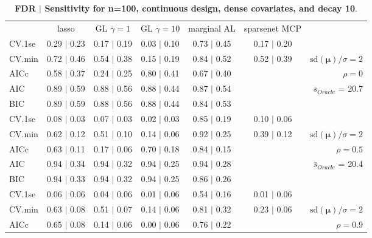 \begin{table}\vspace{-.5cm}
\caption[l]{ {\it }
{ \bf FDR $\boldsymbol{\mid}$ Sensitivity for n=100, continuous design, dense covariates, and  decay  10}.}
\vspace{-.5cm}
\footnotesize{}
\begin{center}
\begin{tabular}{l*{5}{c}|r}
 & lasso & GL $\gamma=1$ & GL $\gamma=10$ & marginal AL & sparsenet MCP  & \\
 \cline{1-7}
CV.1se & 0.29 $\mid$ 0.23 & 0.17 $\mid$ 0.19 & 0.03 $\mid$ 0.10 & 0.73 $\mid$ 0.45 & 0.17 $\mid$ 0.20 & \\
CV.min & 0.72 $\mid$ 0.46 & 0.54 $\mid$ 0.38 & 0.15 $\mid$ 0.19 & 0.84 $\mid$ 0.52 & 0.52 $\mid$ 0.39 &  $\mathrm{sd}(\mathbf{\mu})/\sigma=2$ \\
AICc & 0.58 $\mid$ 0.37 & 0.24 $\mid$ 0.25 & 0.80 $\mid$ 0.41 & 0.67 $\mid$ 0.40 & & $\rho=0$ \\
AIC & 0.89 $\mid$ 0.59 & 0.88 $\mid$ 0.56 & 0.88 $\mid$ 0.44 & 0.87 $\mid$ 0.54 & &  \multirow{2}{*}{$\bar{s}_{Oracle}$ = 20.7} \\
BIC & 0.89 $\mid$ 0.59 & 0.88 $\mid$ 0.56 & 0.88 $\mid$ 0.44 & 0.84 $\mid$ 0.53 & &  \\
 \hline 
CV.1se & 0.08 $\mid$ 0.03 & 0.07 $\mid$ 0.03 & 0.02 $\mid$ 0.03 & 0.85 $\mid$ 0.19 & 0.10 $\mid$ 0.06 & \\
CV.min & 0.62 $\mid$ 0.12 & 0.51 $\mid$ 0.10 & 0.14 $\mid$ 0.06 & 0.92 $\mid$ 0.25 & 0.39 $\mid$ 0.12 &  $\mathrm{sd}(\mathbf{\mu})/\sigma=2$ \\
AICc & 0.63 $\mid$ 0.11 & 0.17 $\mid$ 0.06 & 0.70 $\mid$ 0.18 & 0.84 $\mid$ 0.15 & & $\rho=0.5$ \\
AIC & 0.94 $\mid$ 0.34 & 0.94 $\mid$ 0.32 & 0.94 $\mid$ 0.25 & 0.94 $\mid$ 0.28 & &  \multirow{2}{*}{$\bar{s}_{Oracle}$ = 20.4} \\
BIC & 0.94 $\mid$ 0.33 & 0.94 $\mid$ 0.32 & 0.94 $\mid$ 0.25 & 0.86 $\mid$ 0.26 & &  \\
 \hline 
CV.1se & 0.06 $\mid$ 0.06 & 0.04 $\mid$ 0.06 & 0.01 $\mid$ 0.06 & 0.54 $\mid$ 0.16 & 0.01 $\mid$ 0.06 & \\
CV.min & 0.63 $\mid$ 0.08 & 0.51 $\mid$ 0.07 & 0.14 $\mid$ 0.06 & 0.81 $\mid$ 0.32 & 0.23 $\mid$ 0.06 &  $\mathrm{sd}(\mathbf{\mu})/\sigma=2$ \\
AICc & 0.65 $\mid$ 0.08 & 0.14 $\mid$ 0.06 & 0.00 $\mid$ 0.06 & 0.76 $\mid$ 0.22 & & $\rho=0.9$ \\

\end{tabular}
\end{center}
\end{table}
